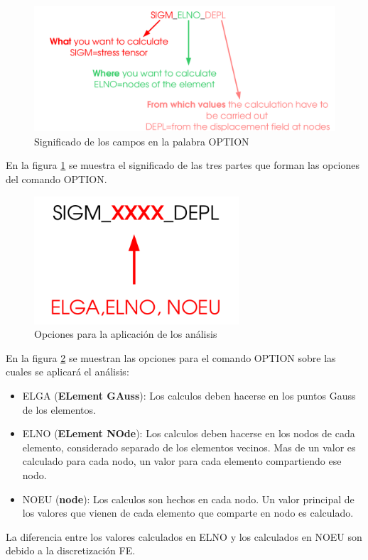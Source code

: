 \documentclass[12pt]{book}
\theoremstyle{definition}
\theoremstyle{remark}
\theoremstyle{plain}
\begin{document}
\begin{figure}
\centering
\includegraphics[width=5in]{significado.png}
\caption{Significado de los campos en la palabra OPTION}
\label{fig6}
\end{figure}
En la figura \ref{fig6} se muestra el significado de las tres partes que forman 
las opciones del comando OPTION.
\begin{figure}
\centering
\includegraphics[width=3in]{opciones.png}
\caption{Opciones para la aplicación de los análisis}
\label{fig7}
\end{figure}

En la figura \ref{fig7} se muestran las opciones para el comando OPTION sobre
las cuales se aplicará el análisis:

\begin{itemize}
 \item ELGA (\textbf{ELement GAuss}): Los calculos deben hacerse en los puntos Gauss
de los elementos.
 \item ELNO (\textbf{ELement NOde}): Los calculos deben hacerse en los nodos de cada
elemento, considerado separado de los elementos vecinos. Mas de un valor es calculado
para cada nodo, un valor para cada elemento compartiendo ese nodo.
 \item NOEU (\textbf{node}): Los calculos son hechos en cada nodo. Un valor principal
de los valores que vienen de cada elemento que comparte en nodo es calculado.
\end{itemize}

La diferencia entre los valores calculados en ELNO y los calculados en NOEU son debido
a la discretización FE.
\end{document}
